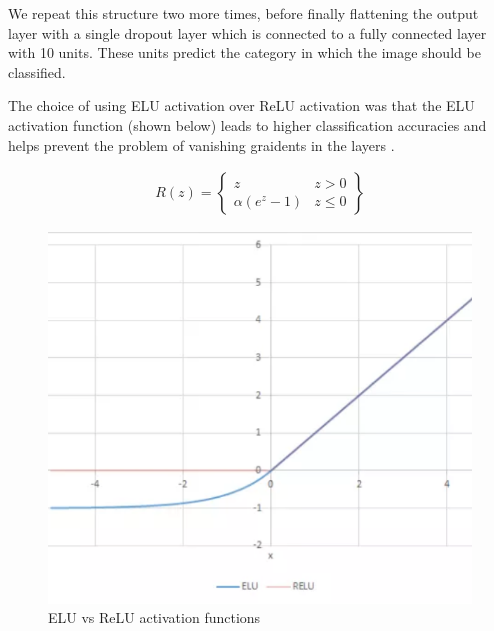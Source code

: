 \documentclass[12pt]{article}
\begin{document}
We repeat this structure two more times, before finally flattening the output layer with a single dropout layer which is connected to a fully connected layer with 10 units. These units predict the category in which the image should be classified.

The choice of using ELU activation over ReLU activation was that the ELU activation function (shown below) leads to higher classification accuracies and helps prevent the problem of vanishing graidents in the layers \cite{clevert2015fast}.

\begin{figure}[htbp]
  \centering
  \begin{minipage}{0.4\textwidth}
    \centering
    \begin{equation}
      \begin{split}R(z) = \begin{Bmatrix} z                 & z > 0    \\
          \alpha ( e^z - 1) & z \leq 0\end{Bmatrix}\end{split}
    \end{equation}
  \end{minipage}\hfill
  \begin{minipage}{0.4\textwidth}
    \centering
    \includegraphics[width=1\textwidth]{results/eluvsrelu.png}
    \caption{ELU vs ReLU activation functions
      \label{fig:eluvsrelu}
    }
  \end{minipage}
\end{figure}
\newpage
\end{document}
